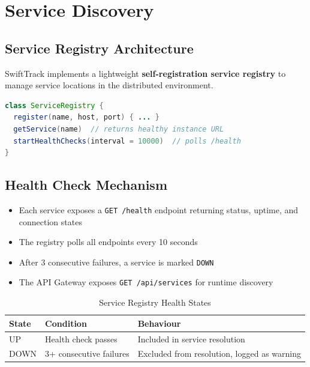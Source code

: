 \documentclass[12pt,a4paper]{article}
\begin{document}
\section{Service Discovery}

\subsection{Service Registry Architecture}

SwiftTrack implements a lightweight \textbf{self-registration service registry} to manage service locations in the distributed environment.

\begin{lstlisting}[language=java, caption={Service Registry}]
class ServiceRegistry {
  register(name, host, port) { ... }
  getService(name)  // returns healthy instance URL
  startHealthChecks(interval = 10000)  // polls /health
}
\end{lstlisting}

\subsection{Health Check Mechanism}

\begin{itemize}
  \item Each service exposes a \texttt{GET /health} endpoint returning status, uptime, and connection states
  \item The registry polls all endpoints every 10 seconds
  \item After 3 consecutive failures, a service is marked \texttt{DOWN}
  \item The API Gateway exposes \texttt{GET /api/services} for runtime discovery
\end{itemize}

\begin{table}[H]
\centering
\caption{Service Registry Health States}
\begin{tabular}{llp{7cm}}
\toprule
\textbf{State} & \textbf{Condition} & \textbf{Behaviour} \\
\midrule
UP & Health check passes & Included in service resolution \\
DOWN & 3+ consecutive failures & Excluded from resolution, logged as warning \\
\bottomrule
\end{tabular}
\end{table}
\end{document}
